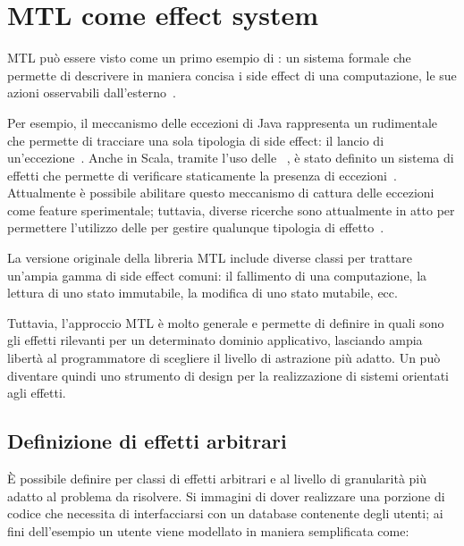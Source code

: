 \section{MTL come effect system}

\ac{MTL} può essere visto come un primo esempio di : un sistema formale che permette di descrivere in maniera concisa i side effect di una computazione, le sue azioni osservabili dall'esterno~\cite[p.~943]{cit:design-concepts-in-programming-languages}.

Per esempio, il meccanismo delle eccezioni di Java rappresenta un rudimentale  che permette di tracciare una sola tipologia di side effect: il lancio di un'eccezione~\cite[p.~985]{cit:design-concepts-in-programming-languages}.
Anche in Scala, tramite l'uso delle ~\cite{cit:scala-3-reference-canthrow}, è stato definito un sistema di effetti che permette di verificare staticamente la presenza di eccezioni~\cite{cit:safer-exceptions-for-scala}. Attualmente è possibile abilitare questo meccanismo di cattura delle eccezioni come feature sperimentale; tuttavia, diverse ricerche sono attualmente in atto per permettere l'utilizzo delle  per gestire qualunque tipologia di effetto~\cite{cit:effects-capabilities-and-boxes-from-scope-based-reasoning-to-type-based-reasoning-and-back,cit:caprese}.

La versione originale della libreria \ac{MTL} include diverse classi per trattare un'ampia gamma di side effect comuni: il fallimento di una computazione, la lettura di uno stato immutabile, la modifica di uno stato mutabile, ecc.

Tuttavia, l'approccio \ac{MTL} è molto generale e permette di definire in  quali sono gli effetti rilevanti per un determinato dominio applicativo, lasciando ampia libertà al programmatore di scegliere il livello di astrazione più adatto.
Un  può diventare quindi uno strumento di design per la realizzazione di sistemi orientati agli effetti.

\subsection{Definizione di effetti arbitrari}
\label{sec:mtl-effetti-arbitrari}
È possibile definire  per classi di effetti arbitrari e al livello di granularità più adatto al problema da risolvere. Si immagini di dover realizzare una porzione di codice che necessita di interfacciarsi con un database contenente degli utenti; ai fini dell'esempio un utente viene modellato in maniera semplificata come:

